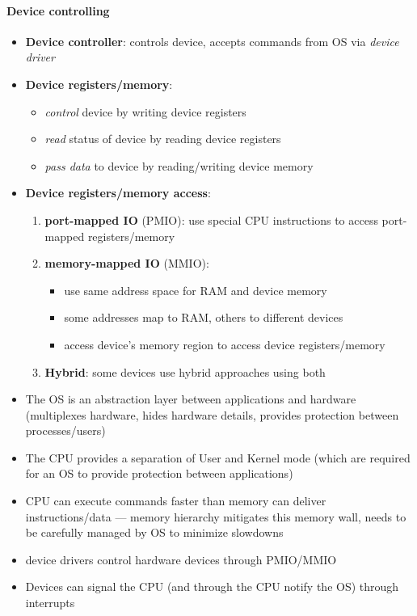 \paragraph{Device controlling}
\begin{itemize}
	\item \textbf{Device controller}: controls device, accepts commands from OS via \emph{device driver}
	\item \textbf{Device registers/memory}:
	\begin{itemize}
		\item \emph{control} device by writing device registers
		\item \emph{read} status of device by reading device registers
		\item \emph{pass data} to device by reading/writing device memory
	\end{itemize}
	\item \textbf{Device registers/memory access}:
	\begin{enumerate}
		\item \textbf{port-mapped IO} (PMIO): use special CPU instructions to access port-mapped registers/memory
		\item \textbf{memory-mapped IO} (MMIO):
		\begin{itemize}
			\item use same address space for RAM and device memory
			\item some addresses map to RAM, others to different devices
			\item access device's memory region to access device registers/memory
		\end{itemize}
		\item \textbf{Hybrid}: some devices use hybrid approaches using both
	\end{enumerate}
\end{itemize}

\begin{summary}
	\begin{itemize}
		\item The OS is an abstraction layer between applications and hardware (multiplexes hardware, hides hardware details, provides protection between processes/users)
		\item The CPU provides a separation of User and Kernel mode (which are required for an OS to provide protection between applications)
		\item CPU can execute commands faster than memory can deliver instructions/data --- memory hierarchy mitigates this memory wall, needs to be carefully managed by OS to minimize slowdowns
		\item device drivers control hardware devices through PMIO/MMIO
		\item Devices can signal the CPU (and through the CPU notify the OS) through interrupts
	\end{itemize}
\end{summary}
